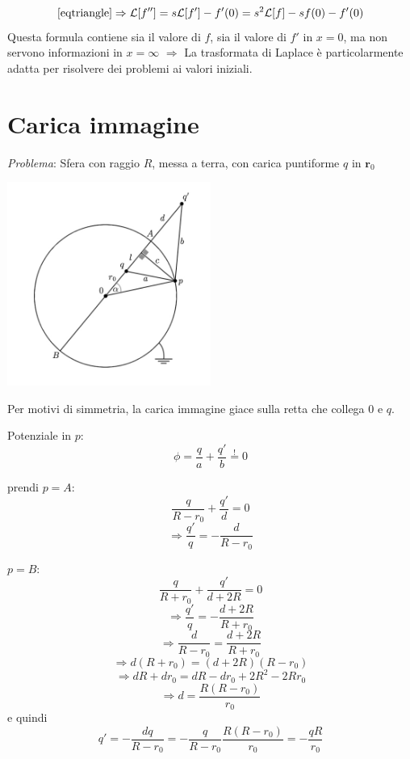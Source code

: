 \documentclass[a4paper,11pt]{report}
\newcommand{\vect}[1]{\boldsymbol{#1}}
\begin{document}
\[
\eqref{eqtriangle} \Rightarrow \mathcal{L}[f'']=s\mathcal{L}[f']-f'(0)=s^2\mathcal{L}[f]-sf(0)-f'(0)
\]
Questa formula contiene sia il valore di $f$, sia il valore di $f'$ in $x=0$, ma non servono informazioni in $x=\infty$ $\Rightarrow$ La trasformata di Laplace \`e particolarmente adatta per risolvere dei problemi ai valori iniziali.

\appendix

\chapter{Carica immagine} \label{caricaimm}

\emph{Problema}: Sfera con raggio $R$, messa a terra, con carica puntiforme $q$ in $\vect{r}_0$

\begin{center}
\includegraphics[width=0.5\textwidth]{immagini/caricaimmagine}
\end{center}

Per motivi di simmetria, la carica immagine giace sulla retta che collega 0 e $q$.

Potenziale in $p$:
\begin{equation}
\phi = \frac{q}{a}+\frac{q'}{b} \overset{!}{=} 0
\label{A1}
\end{equation}

prendi $p=A$:
\begin{equation}
\frac{q}{R-r_0} + \frac{q'}{d}=0
\end{equation}
\[
\Rightarrow \frac{q'}{q}=-\frac{d}{R-r_0}
\]

$p=B$:
\begin{equation}
\frac{q}{R+r_0}+\frac{q'}{d+2R}=0
\end{equation}
\[
\Rightarrow \frac{q'}{q}=-\frac{d+2R}{R+r_0}
\]
\[
\Rightarrow \frac{d}{R-r_0}= \frac{d+2R}{R+r_0}
\]
\[
\Rightarrow d(R+r_0)=(d+2R)(R-r_0)
\]
\[
\Rightarrow dR + dr_0 = dR - dr_0 + 2R^2 - 2Rr_0
\]
\begin{equation}
\Rightarrow d=\frac{R(R-r_0)}{r_0}
\end{equation}
e quindi
\begin{equation}
q' = -\frac{dq}{R-r_0} = -\frac{q}{R-r_0}\frac{R(R-r_0)}{r_0}=-\frac{qR}{r_0}
\label{A5}
\end{equation}
\end{document}
